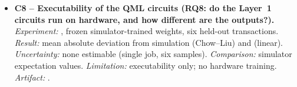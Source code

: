 \begin{itemize}
\item \textbf{C8 -- Executability of the QML circuits (RQ8: do the Layer~1 circuits run on hardware, and how different are the outputs?).} \emph{Experiment:} , frozen simulator-trained weights, six held-out transactions. \emph{Result:} mean absolute deviation from simulation \FezCltMAD{} (Chow--Liu) and \FezLinearMAD{} (linear). \emph{Uncertainty:} none estimable (single job, six samples). \emph{Comparison:} simulator expectation values. \emph{Limitation:} executability only; no hardware training. \emph{Artifact:} .
\end{itemize}
